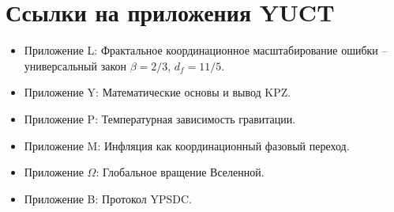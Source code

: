 \documentclass[12pt,a4paper]{article}
\begin{document}
	\section*{Ссылки на приложения YUCT}
	\begin{itemize}
		\item Приложение L: Фрактальное координационное масштабирование ошибки – универсальный закон \(\beta=2/3\), \(d_f=11/5\).
		\item Приложение Y: Математические основы и вывод KPZ.
		\item Приложение P: Температурная зависимость гравитации.
		\item Приложение M: Инфляция как координационный фазовый переход.
		\item Приложение \(\Omega\): Глобальное вращение Вселенной.
		\item Приложение B: Протокол YPSDC.
	\end{itemize}
	
\end{document}
